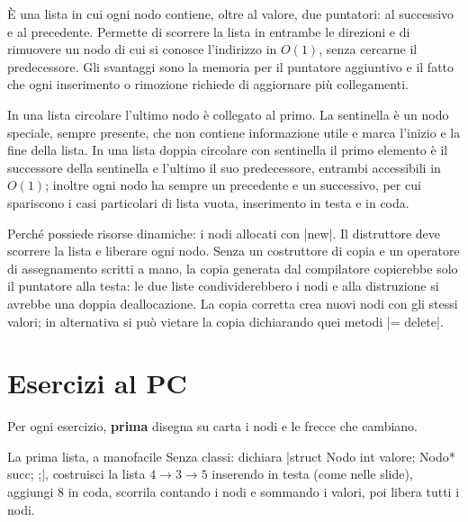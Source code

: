\begin{orale}
È una lista in cui ogni nodo contiene, oltre al valore, due puntatori: al successivo e
al precedente. Permette di scorrere la lista in entrambe le direzioni e di rimuovere un
nodo di cui si conosce l'indirizzo in $O(1)$, senza cercarne il predecessore. Gli
svantaggi sono la memoria per il puntatore aggiuntivo e il fatto che ogni inserimento o
rimozione richiede di aggiornare più collegamenti.
\end{orale}

\begin{orale}
In una lista circolare l'ultimo nodo è collegato al primo. La sentinella è un nodo
speciale, sempre presente, che non contiene informazione utile e marca l'inizio e la fine
della lista. In una lista doppia circolare con sentinella il primo elemento è il
successore della sentinella e l'ultimo il suo predecessore, entrambi accessibili in
$O(1)$; inoltre ogni nodo ha sempre un precedente e un successivo, per cui spariscono i
casi particolari di lista vuota, inserimento in testa e in coda.
\end{orale}

\begin{orale}
Perché possiede risorse dinamiche: i nodi allocati con \cc|new|. Il distruttore deve
scorrere la lista e liberare ogni nodo. Senza un costruttore di copia e un operatore di
assegnamento scritti a mano, la copia generata dal compilatore copierebbe solo il
puntatore alla testa: le due liste condividerebbero i nodi e alla distruzione si avrebbe
una doppia deallocazione. La copia corretta crea nuovi nodi con gli stessi valori; in
alternativa si può vietare la copia dichiarando quei metodi \cc|= delete|.
\end{orale}

\section{Esercizi al PC}

Per ogni esercizio, \textbf{prima} disegna su carta i nodi e le frecce che cambiano.

\begin{esercizio}{La prima lista, a mano}{facile}
Senza classi: dichiara \cc|struct Nodo { int valore; Nodo* succ; };|, costruisci la lista
$4 \to 3 \to 5$ inserendo in testa (come nelle slide), aggiungi 8 in coda, scorrila
contando i nodi e sommando i valori, poi libera tutti i nodi.
\end{esercizio}

